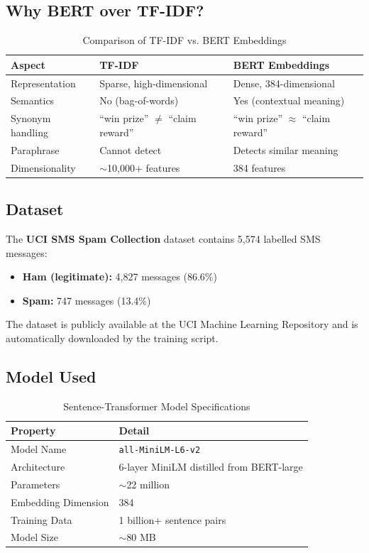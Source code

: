 \documentclass[12pt,a4paper]{article}
\begin{document}
\subsection{Why BERT over TF-IDF?}
\begin{table}[H]
\centering
\renewcommand{\arraystretch}{1.3}
\begin{tabular}{|l|l|l|}
\hline
\textbf{Aspect} & \textbf{TF-IDF} & \textbf{BERT Embeddings} \\
\hline
Representation     & Sparse, high-dimensional       & Dense, 384-dimensional \\
Semantics          & No (bag-of-words)              & Yes (contextual meaning) \\
Synonym handling   & ``win prize'' $\neq$ ``claim reward'' & ``win prize'' $\approx$ ``claim reward'' \\
Paraphrase         & Cannot detect                  & Detects similar meaning \\
Dimensionality     & $\sim$10,000+ features         & 384 features \\
\hline
\end{tabular}
\caption{Comparison of TF-IDF vs. BERT Embeddings}
\end{table}

\subsection{Dataset}
The \textbf{UCI SMS Spam Collection} dataset contains 5,574 labelled SMS messages:
\begin{itemize}
    \item \textbf{Ham (legitimate):} 4,827 messages (86.6\%)
    \item \textbf{Spam:} 747 messages (13.4\%)
\end{itemize}
The dataset is publicly available at the UCI Machine Learning Repository and is automatically downloaded by the training script.

\subsection{Model Used}
\begin{table}[H]
\centering
\renewcommand{\arraystretch}{1.3}
\begin{tabular}{|l|l|}
\hline
\textbf{Property}       & \textbf{Detail} \\
\hline
Model Name              & \texttt{all-MiniLM-L6-v2} \\
Architecture            & 6-layer MiniLM distilled from BERT-large \\
Parameters              & $\sim$22 million \\
Embedding Dimension     & 384 \\
Training Data           & 1 billion+ sentence pairs \\
Model Size              & $\sim$80 MB \\
\hline
\end{tabular}
\caption{Sentence-Transformer Model Specifications}
\end{table}
\end{document}
